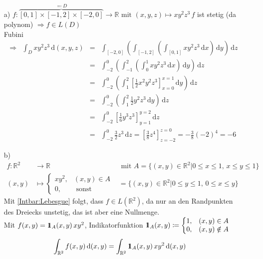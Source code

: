 \begin{itemize}
    \item[a)] $f\colon \overbrace{[0,1]\times [-1,2] \times [-2,0]}^{\eqqcolon D} \to \mathbb{R} \text{ mit } (x,y,z) \mapsto xy^2 z^3 \, f$ ist stetig (da polynom) $\Rightarrow f\in L(D)$\\
    Fubini \begin{align*}
        \Rightarrow & \int_D xy^2 z^3 \, \text{d}(x,y,z) &=& \int_{[-2,0]}\left(\int_{[-1,2]}\left(\int_{[0,1]} xy^2 z^3 \, \text{d}x \right)\, \text{d}y\right)\, \text{d}z\\
        & &=& \int_{-2}^0 \left(\int_{-1}^2 \left(\int_0^1 x y^2 z^3 \, \text{d}x\right)\, \text{d}y\right)\, \text{d}z\\
        & &=& \int_{-2}^0 \left(\int_1^2 [\frac{1}{2}x^2 y^2 z^3]_{x=0}^{x=1} \, \text{d}y\right)\, \text{d}z\\
        & &=& \int_{-2}^0 \left(\int_1^2 \frac{1}{2}y^2 z^3 \, \text{d}y\right)\, \text{d}z\\
        & &=& \int_{-2}^0 [\frac{1}{6} y^3 z^3]_{y=1}^{y=2} \, \text{d}z\\
        & &=& \int_{-2}^0 \frac{3}{2} z^3 \, \text{d}z = [\frac{3}{8} z^4]_{z=-2}^{z=0} = -\frac{3}{8}(-2)^4 = -6
    \end{align*} 
    \item[b)] \begin{align*}
        f\colon \mathbb{R}^2 &\to \mathbb{R} & \text{ mit } A = \{(x,y) \in \mathbb{R}^2 | 0 \leq x \leq 1, \,x \leq y \leq 1\}\\
        (x,y) &\mapsto \left\{\begin{matrix}
            xy^2 ,& (x,y) \in A\\
            0 ,& \text{ sonst}
        \end{matrix}\right. & = \{(x,y)\in\mathbb{R}^2 | 0\leq y\leq 1, \,0\leq x\leq y\}
    \end{align*}
    Mit \ref{Intbar:Lebesgue} folgt, dass $f\in L(\mathbb{R}^2)$, da nur an den Randpunkten des Dreiecks unstetig, das ist aber eine Nullmenge.\\
    Mit \(f(x,y) = \id_A (x,y)\, xy^2\), Indikatorfunktion \(\id_A (x,y) \coloneqq \left\{ \begin{matrix}
        1,& (x,y) \in A\\
        0,& (x,y) \notin A
    \end{matrix} \right.\)
    \begin{align*}
        \int_{\mathbb{R}^2} f(x,y) \,\text{d}(x,y) &= \int_{\mathbb{R}^2} \id_A (x,y) \, xy^2 \, \text{d}(x,y) & \\

\end{align*}
\end{itemize}
